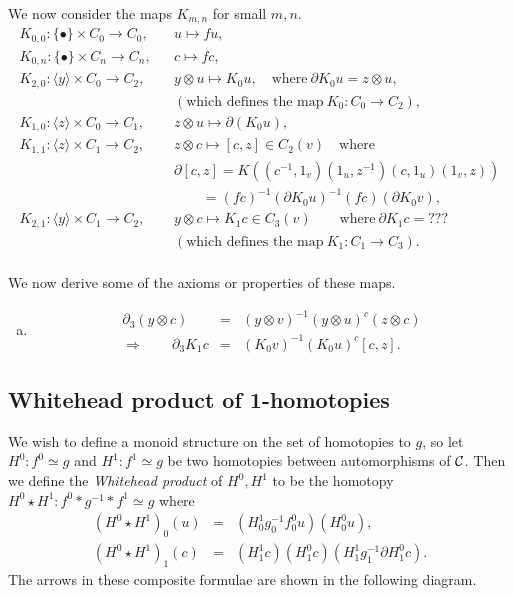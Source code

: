 \newpage
We now consider the maps $K_{m,n}$ for small $m,n$. 
\begin{eqnarray*}
K_{0,0} : \{\bullet\}\times C_0 \to C_0,  
  &&  u \mapsto fu, \\
K_{0,n} : \{\bullet\}\times C_n \to C_n,  
  &&  c \mapsto fc, \\
K_{2,0} : \langle y \rangle \times C_0 \to C_2,  
  &&  y \otimes u \mapsto K_0 u, 
      \quad\text{where}~ \partial K_0 u = z \otimes u, \\
  &&  (\text{which defines the map}~ K_0 : C_0 \to C_2), \\
K_{1,0} : \langle z \rangle \times C_0 \to C_1,  
  &&  z \otimes u \mapsto \partial(K_0u), \\
K_{1,1} : \langle z \rangle \times C_1 \to C_2,  
  &&  z \otimes c \mapsto [c,z] \in C_2(v) \quad \text{where} \\
  &&  \partial[c,z] = K\left((c^{-1},1_v)(1_u,z^{-1})(c,1_u)(1_v,z)\right) \\
  &&  \quad\quad = (fc)^{-1}(\partial K_0u)^{-1}(fc)(\partial K_0 v), \\
K_{2,1} : \langle y \rangle \times C_1 \to C_2,  
  &&  y \otimes c \mapsto K_1c \in C_3(v) 
      \qquad\text{where}~ \partial K_1 c = ??? \\
  &&  (\text{which defines the map}~ K_1 : C_1 \to C_3). \\
\end{eqnarray*}

\noindent
We now derive some of the axioms or properties of these maps. 

\noindent
\begin{enumerate}[(a)] 
\item
\begin{eqnarray*}
\partial_3(y \otimes c) 
  &=&  (y \otimes v)^{-1}(y \otimes u)^c(z \otimes c) \\
\Rightarrow \qquad \partial_3 K_1c 
  &=& (K_0 v)^{-1} (K_0 u)^c [c,z].
\end{eqnarray*}
\end{enumerate}


\bigskip
\subsection{Whitehead product of 1-homotopies}
\label{subsect:wprod-xcomp}

We wish to define a monoid structure on the set of homotopies to $g$, 
so let $H^0 : f^0 \simeq g$ and $H^1 : f^1 \simeq g$ be two homotopies 
between automorphisms of $\mathcal{C}$. 
Then we define the \emph{Whitehead product} of $H^0,H^1$ to be 
the homotopy $H^0 \star H^1 : f^0*g^{-1}*f^1 \simeq g$ where 
\begin{eqnarray*}
(H^0 \star H^1)_0(u) &=& (H^1_0g^{-1}_0f^0_0u)(H^0_0u), \\ 
(H^0 \star H^1)_1(c) &=& (H^1_1c)(H^0_1c)(H^1_1g^{-1}_1\partial H^0_1c). 
\end{eqnarray*}
The arrows in these composite formulae are shown in the following diagram.

